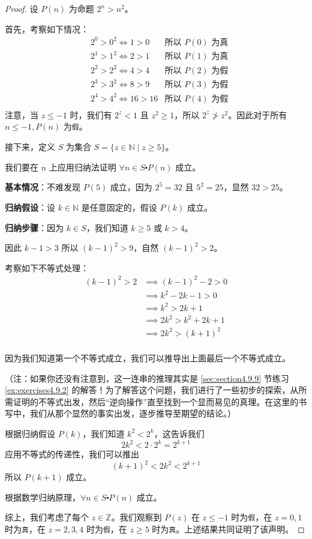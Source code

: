 \begin{proof}
    设 $P(n)$ 为命题 $2^n > n^2$。

    首先，考察如下情况：
    \begin{align*}
        & 2^0 > 0^2 \iff 1>0 & \text{所以 } P(0) \text{ 为真}\\
        & 2^1 > 1^2 \iff 2>1 & \text{所以 } P(1) \text{ 为真}\\
        & 2^2 > 2^2 \iff 4>4 &  \text{所以 } P(2) \text{ 为假}\\
        & 2^3 > 3^2 \iff 8>9 &  \text{所以 } P(3) \text{ 为假}\\
        & 2^4 > 4^2 \iff 16>16 & \text{所以 } P(4) \text{ 为假}\\
    \end{align*}
    注意，当 $z \le -1$ 时，我们有 $2^z < 1$ 且 $z^2 \ge 1$，所以 $2^z \ngtr z^2$。因此对于所有 $n \le -1, P(n)$ 为\verb|假|。

    接下来，定义 $S$ 为集合 $S = \{z \in \mathbb{N} \mid z \ge 5\}$。

    我们要在 $n$ 上应用归纳法证明 $\forall n \in S \centerdot P(n)$ 成立。

    \textbf{基本情况}：不难发现 $P(5)$ 成立，因为 $2^5=32$ 且 $5^2=25$，显然 $32 > 25$。

    \textbf{归纳假设}：设 $k \in \mathbb{N}$ 是任意固定的，假设 $P(k)$ 成立。

    \textbf{归纳步骤}：因为 $k \in S$，我们知道 $k \ge 5$ 或 $k > 4$。
    
    因此 $k-1>3$ 所以 $(k-1)^2>9$，自然 $(k-1)^2>2$。

    考察如下不等式处理：
    \begin{align*}
        (k-1)^2 > 2 &\implies (k-1)^2-2>0 \\
        &\implies k^2-2k-1>0 \\
        &\implies k^2>2k+1 \\
        &\implies 2k^2>k^2+2k+1 \\
        &\implies 2k^2>(k+1)^2 \\
    \end{align*}

    因为我们知道第一个不等式成立，我们可以推导出上面最后一个不等式成立。

    （注：如果你还没有注意到，这一连串的推理其实是 \ref{sec:section4.9.9} 节练习 \ref{ex:exercises4.9.2} 的解答！为了解答这个问题，我们进行了一些初步的探索，从所需证明的不等式出发，然后``逆向操作''直至找到一个显而易见的真理。在这里的书写中，我们从那个显然的事实出发，逐步推导至期望的结论。）

    根据归纳假设 $P(k)$，我们知道 $k^2 < 2^k$，这告诉我们
    \[2k^2 < 2 \cdot 2^k = 2^{k+1}\]
    应用不等式的传递性，我们可以推出
    \[(k + 1)^2 < 2k^2 < 2^{k+1}\]
    所以 $P(k+1)$ 成立。

    根据数学归纳原理，$\forall n \in S \centerdot P(n)$ 成立。

    综上，我们考虑了每个 $z \in \mathbb{Z}$。我们观察到 $P(z)$ 在 $z \le -1$ 时为\verb|假|，在 $z = 0, 1$ 时为\verb|真|，在 $z = 2, 3, 4$ 时为\verb|假|，在 $z \ge 5$ 时为\verb|真|。上述结果共同证明了该声明。
\end{proof}

